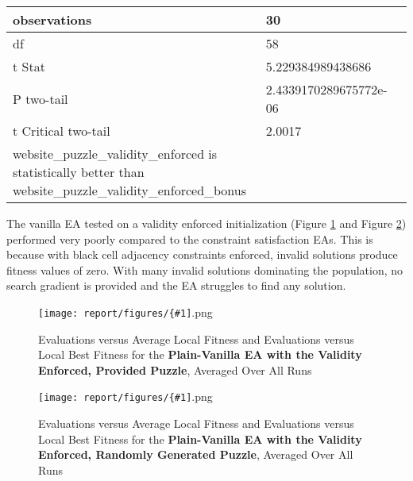 \documentclass[11pt]{article}
\newcommand{\fitnessplotcaption}[1]{\caption{Evaluations versus Average Local Fitness and Evaluations versus 
    Local Best Fitness for the \textbf{{#1}}, Averaged Over All Runs}}
\newcommand{\addgraphic}[1]{\centerline{\texttt{[image: report/figures/\{\#1]}.png}}}
\begin{document}
\begin{table}[H]
{\begin{tabular}{|l|l|l|}
    observations                                                                                                & 30                                  &                                            \\ \hline
    df                                                                                                          & 58                                  &                                            \\ \hline
    t Stat                                                                                                      & 5.229384989438686                   &                                            \\ \hline
    P two-tail                                                                                                  & 2.4339170289675772e-06              &                                            \\ \hline
    t Critical two-tail                                                                                         & 2.0017                              &                                            \\ \hline
    website\_puzzle\_validity\_enforced is statistically better than website\_puzzle\_validity\_enforced\_bonus &                                     &                                            \\ \hline
    \end{tabular}%
    }
\end{table}


The vanilla EA tested on a validity enforced initialization (Figure \ref{fig:website_puzzle_validity_enforced_vanilla_graph} 
and Figure \ref{fig:random_gen_validity_enforced_vanilla_graph}) performed very poorly compared to the constraint satisfaction EAs.
This is because with black cell adjacency constraints enforced, invalid solutions produce fitness values of zero. With many invalid solutions
dominating the population, no search gradient is provided and the EA struggles to find any solution.

\begin{figure}[H]
    \addgraphic{website_puzzle_validity_enforced_vanilla_graph}
    \fitnessplotcaption{Plain-Vanilla EA with the Validity Enforced, Provided Puzzle}
    \label{fig:website_puzzle_validity_enforced_vanilla_graph}
\end{figure}

\begin{figure}[H]
    \addgraphic{random_gen_validity_enforced_vanilla_graph}
    \fitnessplotcaption{Plain-Vanilla EA with the Validity Enforced, Randomly Generated Puzzle}
    \label{fig:random_gen_validity_enforced_vanilla_graph}
\end{figure}
\end{document}
